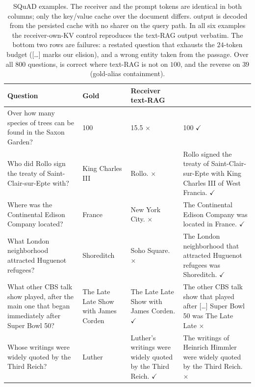 \begin{table}[t]
\centering\small
\caption{SQuAD examples. The receiver and the prompt tokens are identical in both columns; only
the key/value cache over the document differs. \sys{} output is decoded from the persisted cache
with no sharer on the query path. In all six examples the receiver-own-KV control reproduces the
text-RAG output verbatim. The bottom two rows are failures: a restated question that exhausts the
$24$-token budget ([\ldots] marks our elision), and a wrong entity taken from the passage. Over all
$800$ questions, \sys{} is correct where text-RAG is not on $100$, and the reverse on $39$
(gold-alias containment).}
\label{tab:examples}
\begin{tabular}{@{}p{}p{}p{}p{}@{}}
\toprule
Question & Gold & Receiver text-RAG & \sys{} \\
\midrule
Over how many species of trees can be found in the Saxon Garden?
  & 100 & 15.5 \hfill $\times$ & 100 \hfill $\checkmark$ \\
Who did Rollo sign the treaty of Saint-Clair-sur-Epte with?
  & King Charles III & Rollo. \hfill $\times$
  & Rollo signed the treaty of Saint-Clair-sur-Epte with King Charles III of West Francia. \hfill $\checkmark$ \\
Where was the Continental Edison Company located?
  & France & New York City. \hfill $\times$
  & The Continental Edison Company was located in France. \hfill $\checkmark$ \\
What London neighborhood attracted Huguenot refugees?
  & Shoreditch & Soho Square. \hfill $\times$
  & The London neighborhood that attracted Huguenot refugees was Shoreditch. \hfill $\checkmark$ \\
\midrule
What other CBS talk show played, after the main one that began immediately after Super Bowl 50?
  & The Late Late Show with James Corden & The Late Late Show with James Corden. \hfill $\checkmark$
  & The other CBS talk show that played after [\ldots] Super Bowl 50 was The Late Late \hfill $\times$ \\
Whose writings were widely quoted by the Third Reich?
  & Luther & Luther's writings were widely quoted by the Third Reich. \hfill $\checkmark$
  & The writings of Heinrich Himmler were widely quoted by the Third Reich. \hfill $\times$ \\
\bottomrule
\end{tabular}
\end{table}
